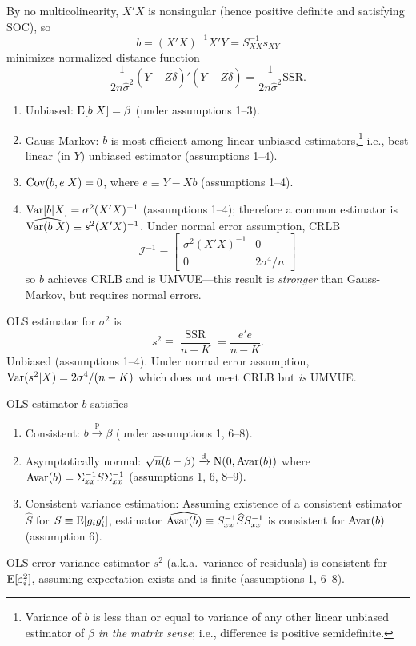 \documentclass[8pt,letterpaper, landscape]{extarticle} %
\begin{document}
\begin{multicols}{3}
\begin{description}
By no multicolinearity, $ X' X $ is nonsingular (hence positive definite and satisfying SOC), so
$$ b = (X' X)^{-1} X'Y = S_{XX}^{-1} s_{XY} $$
minimizes normalized distance function
\[ \frac{1}{2 n \hat{\sigma}^2} (Y - Z \tilde{\delta})' (Y - Z \tilde{\delta}) = \frac{1}{2 n \hat{\sigma}^2} \text{SSR}. \]
\begin{enumerate}
\item Unbiased: $ \operatorname{E} [b | X] = \beta $ (under assumptions 1--3).
\item Gauss-Markov: $ b $ is most efficient among linear unbiased estimators,\footnote{Variance of $ b $ is less than or equal to variance of any other linear unbiased estimator of $ \beta $ \textit{in the matrix sense}; i.e., difference is positive semidefinite.} i.e., best linear (in $ Y $) unbiased estimator (assumptions 1--4).
\item $ \operatorname{Cov} (b, e | X) = 0 $, where $ e \equiv Y - Xb $ (assumptions 1--4).
\item $ \operatorname{Var} [b | X] = \sigma^2 (X'X)^{-1} $ (assumptions 1--4); therefore a common estimator is $ \widehat{\operatorname{Var} (b|X)} \equiv s^2 (X'X)^{-1} $. Under normal error assumption, CRLB
$$ \mathcal{I}^{-1} =  \begin{bmatrix}
\sigma^{2} (X'X)^{-1} & 0 \\ 
0 & 2 \sigma^{4} / n
\end{bmatrix} $$
so $ b $ achieves CRLB and is UMVUE---this result is \textit{stronger} than Gauss-Markov, but requires normal errors.
\end{enumerate}

OLS estimator for $ \sigma^2 $ is $$ s^2 \equiv \frac{\operatorname{SSR}}{n-K} = \frac{e'e}{n-K}. $$
Unbiased (assumptions 1--4). Under normal error assumption, $ \operatorname{Var} (s^2 | X) = 2 \sigma^4 / (n-K) $ which does not meet CRLB but \textit{is} UMVUE.

 OLS estimator $ b $ satisfies
\begin{enumerate}
\item Consistent: $ b \xrightarrow{\text{p}} \beta $ (under assumptions 1, 6--8).
\item Asymptotically normal: $ \sqrt{n} (b - \beta) \xrightarrow{\text{d}} \operatorname{N} (0, \operatorname{Avar} (b)) $ where $ \operatorname{Avar} (b) = \Sigma_{xx}^{-1} S \Sigma_{xx}^{-1} $ (assumptions 1, 6, 8--9).
\item Consistent variance estimation: Assuming existence of a consistent estimator $ \widehat{S} $ for $ S \equiv \operatorname{E} [g_i g_{i}' ] $, estimator $ \widehat{\operatorname{Avar} (b)} \equiv S_{xx}^{-1} \widehat{S} S_{xx}^{-1} $ is consistent for $ \operatorname{Avar} (b) $ (assumption 6).
\end{enumerate}
OLS error variance estimator $ s^2 $ (a.k.a.\ variance of residuals) is consistent for $ \operatorname{E} [\varepsilon_{i}^{2}] $, assuming expectation exists and is finite (assumptions 1, 6--8).


\end{description}
\end{multicols}
\end{document}
